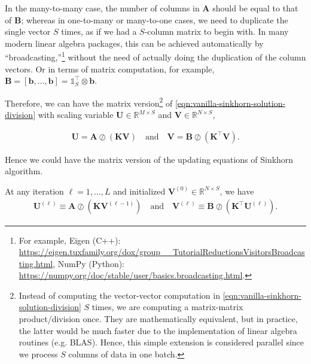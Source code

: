 \begin{remark}[]
  In the many-to-many case, the number of columns in $\mathbf{A}$ should be equal to that of $\mathbf{B}$;
  whereas in one-to-many or many-to-one cases, we need to duplicate the single vector $S$ times,
  as if we had a $S$-column matrix to begin with.
  In many modern linear algebra packages, this can be achieved automatically by ``broadcasting,''\footnote{
    For example,
    Eigen (C++): \url{https://eigen.tuxfamily.org/dox/group__TutorialReductionsVisitorsBroadcasting.html},
    NumPy (Python): \url{https://numpy.org/doc/stable/user/basics.broadcasting.html}.
  }
  without the need of actually doing the duplication of the column vectors.
  Or in terms of matrix computation,
  for example,
  $\mathbf{B} = \left[\mathbf{b}, \ldots, \mathbf{b}\right] = \mathbb{1}_S^\top \otimes \mathbf{b}$.
\end{remark}

Therefore, we can have the matrix version\footnote{
  Instead of computing the vector-vector computation in \cref{eqn:vanilla-sinkhorn-solution-division} $S$ times,
  we are computing a matrix-matrix product/division once.
  They are mathematically equivalent, but in practice,
  the latter would be much faster due to the implementation of linear algebra routines (e.g. BLAS).
  Hence, this simple extension is considered parallel since we process $S$ columns of data in one batch.
} of \cref{eqn:vanilla-sinkhorn-solution-division} with scaling variable
$\mathbf{U} \in \mathbb{R}^{M\times S}$ and $\mathbf{V} \in \mathbb{R}^{N\times S}$,

\begin{equation}
  \begin{aligned}
    \mathbf{U} = \mathbf{A} \oslash (\mathbf{K}\mathbf{V})
    \quad\text{and}\quad
    \mathbf{V} = \mathbf{B} \oslash (\mathbf{K}^\top \mathbf{V}).
  \end{aligned}
\end{equation}

Hence we could have the matrix version of the updating equations of Sinkhorn algorithm.

\begin{update}\label{update:parallel-sinkhorn}
  At any iteration $\ell = 1, \ldots, L$ and initialized $\mathbf{V}^{(0)} \in \mathbb{R}^{N\times S}$, we have
  \begin{equation}
    \begin{aligned}
      \mathbf{U}^{(\ell)} \equiv \mathbf{A} \oslash (\mathbf{K} \mathbf{V}^{(\ell-1)})
      \quad\text{and}\quad
      \mathbf{V}^{(\ell)} \equiv \mathbf{B} \oslash (\mathbf{K}^\top \mathbf{U}^{(\ell)}).
    \end{aligned}
  \end{equation}
\end{update}


